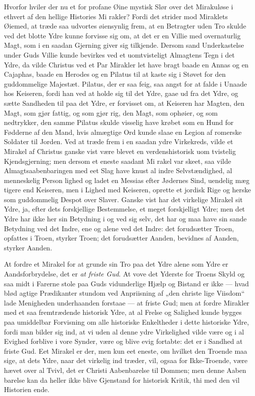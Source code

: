 \documentclass[12pt]{book}
\newcommand{\opage}[1]{\marginnote{\footnotesize\textit{[#1]}}}
\begin{document}
Hvorfor hviler der nu et for profane Øine mystisk Slør
over det Mirakuløse i ethvert af den hellige Histories Mi\-%
rakler? Fordi det strider mod Miraklets Øiemed, at træde
saa udvortes øiensynlig frem, at en Betragter uden Tro skulde
ved det blotte Ydre kunne forvisse sig om, at det er en
Villie med overnaturlig Magt, som i en saadan Gjerning giver
sig tilkjende. Dersom sand Underkastelse under Guds Villie
kunde bevirkes ved et uomtvisteligt Almagtens Tegn i det
Ydre, da vilde Christus ved et Par Mirakler let have bragt
baade en Annas og en Cajaphas, baade en Herodes og
en Pilatus til at kaste sig i Støvet for den guddommelige
Majestæt. Pilatus, der er saa feig, saa angst for at falde
i Unaade hos Keiseren, fordi han ved at holde sig til det
Ydre, gaae ud fra det Ydre, og sætte Sandheden til paa det
Ydre, er forvisset om, at Keiseren har Magten, den Magt, som
gjør fattig, og som gjør rig, den Magt, som ophøier, og som
nedtrykker, den samme Pilatus skulde visselig have krøbet som
en Hund for Fødderne af den Mand, hvis almægtige Ord
kunde slaae en Legion af romerske Soldater til Jorden. Ved
at træde frem i en saadan ydre Virkekreds, vilde et Mirakel
af Christus ganske vist være blevet en verdenshistorisk uom\-%
tvistelig Kjendsgjerning; men dersom et eneste saadant Mi\-%
rakel var skeet, saa vilde Almagtsaabenbaringen med eet Slag
have knust al indre Selvstændighed, al menneskelig Person\-%
\opage{309}\setcounter{footnote}{0}%
lighed og ladet en Messias efter Jødernes Sind, uendelig mæg\-%
tigere end Keiseren, men i Lighed med Keiseren, oprette et
jordisk Rige og herske som guddommelig Despot over Slaver.
Ganske vist har det virkelige Mirakel sit Ydre, ja, efter dets
forskjellige Bestemmelse, et meget forskjelligt Ydre; men det
Ydre har ikke her sin Betydning i og ved sig selv, det har
og maa have sin sande Betydning ved det Indre, ene og
alene ved det Indre: det forudsætter Troen, opfattes i Troen,
styrker Troen; det forudsætter Aanden, bevidnes af Aanden,
styrker Aanden.

At fordre et Mirakel for at grunde sin Tro paa det Ydre
alene som Ydre er Aandsforbrydelse, det er \emph{at friste Gud}. At
vove det Yderste for Troens Skyld og saa midt i Farerne stole
paa Guds vidunderlige Hjælp og Bistand er ikke --- hvad blød\-%
agtige Prædikanter stundom ved Anpriisning af „den christe\-%
lige Viisdom“ lade Menigheden underhaanden forstaae --- at
friste Gud; men at fordre Mirakler med et saa fremtrædende
historisk Ydre, at al Frelse og Salighed kunde bygges paa
umiddelbar Forvisning om alle historiske Enkeltheder i dette
historiske Ydre, fordi man bilder sig ind, at vi uden al
denne ydre Virkelighed vilde være og i al Evighed forblive
i vore Synder, være og blive evig fortabte: det er i Sandhed at
friste Gud. Eet Mirakel er der, men kun eet eneste, om hvilket
den Troende maa sige, at dets Ydre, naar det virkelig ind\-%
træder, vil, ogsaa for Ikke-Troende, være hævet over al Tvivl,
det er Christi Aabenbarelse til Dommen; men denne Aaben\-%
barelse kan da heller ikke blive Gjenstand for historisk Kritik,
thi med den vil Historien ende.
\end{document}
